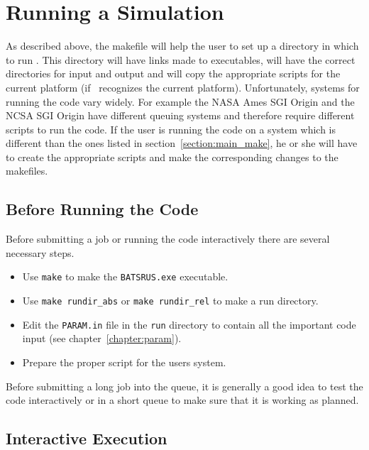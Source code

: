 \section{Running a Simulation \label{section:running}}

As described above, the makefile will help the user to set up a directory
in which to run \BATSRUS.  This directory will have links made to
executables, will have the correct directories for input and output
and will copy the appropriate scripts for the current platform (if
\BATSRUS\ recognizes the current platform).  Unfortunately, systems
for running the code vary widely.  For example the NASA
Ames SGI Origin and the NCSA SGI Origin have different queuing systems
and therefore require different scripts to run the code. If the
user is running the code on a system which is different than the 
ones listed in section~\ref{section:main_make}, 
he or she will have to create the appropriate
scripts and make the corresponding changes to the makefiles.

\subsection{Before Running the Code \label{section:before_running}}

Before submitting a job or running the code interactively there are
several necessary steps.
\begin{itemize}
\item Use {\tt make} to make the {\tt BATSRUS.exe} executable.
\item Use {\tt make rundir\_abs} or {\tt make rundir\_rel}  to make a run directory.
\item Edit the {\tt PARAM.in} file in the {\tt run} directory to contain
      all the important code input (see chapter~\ref{chapter:param}).
\item Prepare the proper script for the users system.
\end{itemize}

Before submitting a long job into the queue, it is generally a good idea
to test the code interactively or in a short queue to make sure that
it is working as planned.


\subsection{Interactive Execution \label{section:interactive}}

